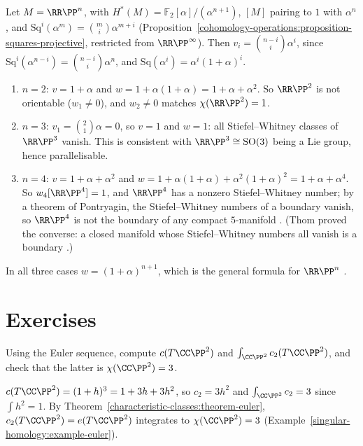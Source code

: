 \begin{example}\label{characteristic-classes:example-wu-projective}
Let $M = \RR\PP^n$, with $H^*(M) = \mathbb{F}_2[\alpha]/(\alpha^{n+1})$, $[M]$ pairing to $1$ with $\alpha^n$, and $\mathrm{Sq}^i(\alpha^m) = \binom{m}{i}\alpha^{m+i}$
(Proposition~\ref{cohomology-operations:proposition-squares-projective}, restricted from $\RR\PP^\infty$). Then $v_i = \binom{n-i}{i}\alpha^i$, since
$\mathrm{Sq}^i(\alpha^{n-i}) = \binom{n-i}{i}\alpha^n$, and $\mathrm{Sq}(\alpha^i) = \alpha^i(1 + \alpha)^i$.
\begin{enumerate}
\item $n = 2$: $v = 1 + \alpha$ and $w = 1 + \alpha(1 + \alpha) = 1 + \alpha + \alpha^2$. So $\RR\PP^2$ is not orientable ($w_1 \neq 0$), and
$w_2 \neq 0$ matches $\chi(\RR\PP^2) = 1$.
\item $n = 3$: $v_1 = \binom{2}{1}\alpha = 0$, so $v = 1$ and $w = 1$: all Stiefel--Whitney classes of $\RR\PP^3$ vanish. This is consistent with
$\RR\PP^3 \cong \mathrm{SO}(3)$ being a Lie group, hence parallelisable.
\item $n = 4$: $v = 1 + \alpha + \alpha^2$ and $w = 1 + \alpha(1 + \alpha) + \alpha^2(1 + \alpha)^2 = 1 + \alpha + \alpha^4$. So $w_4[\RR\PP^4] = 1$, and
$\RR\PP^4$ has a nonzero Stiefel--Whitney number; by a theorem of Pontryagin, the Stiefel--Whitney numbers of a boundary vanish, so
$\RR\PP^4$ is not the boundary of any compact $5$-manifold \cite[Chapter 4]{milnor-stasheff}. (Thom proved the converse: a closed manifold whose
Stiefel--Whitney numbers all vanish is a boundary \cite{thom-1954}.)
\end{enumerate}
In all three cases $w = (1 + \alpha)^{n+1}$, which is the general formula for $\RR\PP^n$ \cite[Chapter 4]{milnor-stasheff}.
\end{example}

\section{Exercises}\label{characteristic-classes:section-exercises}

\begin{exercise}\label{characteristic-classes:exercise-chern-projective}
Using the Euler sequence, compute $c(T\CC\PP^2)$ and $\int_{\CC\PP^2}c_2(T\CC\PP^2)$, and check that the latter is $\chi(\CC\PP^2) = 3$.
\end{exercise}

\begin{solution}
$c(T\CC\PP^2) = (1 + h)^3 = 1 + 3h + 3h^2$, so $c_2 = 3h^2$ and $\int_{\CC\PP^2}c_2 = 3$ since $\int h^2 = 1$. By Theorem~\ref{characteristic-classes:theorem-euler}, $c_2(T\CC\PP^2) = e(T\CC\PP^2)$ integrates to
$\chi(\CC\PP^2) = 3$ (Example~\ref{singular-homology:example-euler}).
\end{solution}

